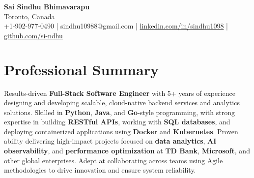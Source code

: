 \documentclass[letterpaper,11pt]{article}
\begin{document}
\begin{center}
  {\Large \textbf{Sai Sindhu Bhimavarapu}} \\
  Toronto, Canada \\
  +1-902-977-0490 \enspace | \enspace sindhu10988@gmail.com \enspace | \enspace \href{https://www.linkedin.com/in/sindhu1098/}{linkedin.com/in/sindhu1098} \enspace | \enspace \href{https://github.com/si-ndhu}{github.com/si-ndhu}
\end{center}

\section{Professional Summary}
  \begin{itemize}[leftmargin=0.15in, label={}]
    \small{\item{
     Results-driven \textbf{Full-Stack Software Engineer} with 5+ years of experience designing and developing scalable, cloud-native backend services and analytics solutions. Skilled in \textbf{Python}, \textbf{Java}, and \textbf{Go}-style programming, with strong expertise in building \textbf{RESTful APIs}, working with \textbf{SQL databases}, and deploying containerized applications using \textbf{Docker} and \textbf{Kubernetes}. Proven ability delivering high-impact projects focused on \textbf{data analytics}, \textbf{AI observability}, and \textbf{performance optimization} at \textbf{TD Bank}, \textbf{Microsoft}, and other global enterprises. Adept at collaborating across teams using Agile methodologies to drive innovation and ensure system reliability.
    }}
  \end{itemize}
\vspace{-16pt}

\end{document}
